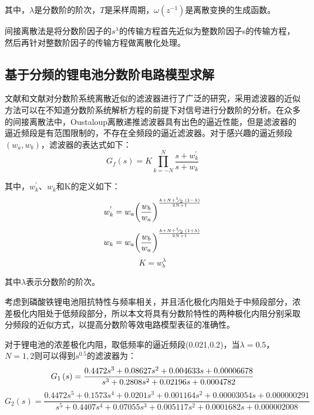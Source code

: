 其中，$\lambda $是分数阶的阶次，$T$是采样周期，$\omega \left( {{z}^{-1}} \right)$是离散变换的生成函数。

间接离散法是将分数阶因子的${{s}^{\lambda }}$的传输方程首先近似为整数阶因子s的传输方程，然后再针对整数阶因子的传输方程做离散化处理。
\subsection{基于分频的锂电池分数阶电路模型求解}
文献和文献对分数阶系统离散近似的滤波器进行了广泛的研究，采用滤波器的近似方法可以在不知道分数阶系统解析方程的前提下对信号进行分数阶的分析。在众多的间接离散法中，Oustaloup离散递推滤波器具有出色的逼近性能，但是滤波器的逼近频段是有范围限制的，不存在全频段的逼近滤波器。对于感兴趣的逼近频段$\left( {{w}_{a}},{{w}_{b}} \right)$，滤波器的表达式如下：
\begin{equation}
{{G}_{f}}\left( s \right)=K\prod\limits_{k=-N}^{N}{\frac{s+w_{k}^{'}}{s+{{w}_{k}}}}
\end{equation}

其中，$w_{k}^{'}$、${{w}_{k}}$和K的定义如下：
\begin{equation}
w_{k}^{'}={{w}_{a}}{{\left( \frac{{{w}_{b}}}{{{w}_{a}}} \right)}^{\frac{k+N+{}^{1}\!\!\diagup\!\!{}_{2}\;\left( 1-\lambda  \right)}{2N+1}}}
\end{equation}
\begin{equation}
{{w}_{k}}={{w}_{a}}{{\left( \frac{{{w}_{b}}}{{{w}_{a}}} \right)}^{\frac{k+N+{}^{1}\!\!\diagup\!\!{}_{2}\;\left( 1+\lambda  \right)}{2N+1}}}
\end{equation}
\begin{equation}
K=w_{b}^{\lambda }
\end{equation}

其中$\lambda $表示分数阶的阶次。

考虑到磷酸铁锂电池阻抗特性与频率相关，并且活化极化内阻处于中频段部分，浓差极化内阻处于低频段部分，所以本文将具有分数阶特性的两种极化内阻分别采取分频段的近似方式，以提高分数阶等效电路模型表征的准确性。

对于锂电池的浓差极化内阻，取低频率的逼近频段(0.021,0.2)，当$\lambda =0.5$，$N=1,2$则可以得到${{s}^{0.5}}$的滤波器为：
\begin{equation}
{G_1}\left( s \right) = \frac{{0.4472{s^3} + 0.08627{s^2} + 0.004633s + 0.00006678}}{{{s^3} + 0.2808{s^2} + 0.02196s + {\rm{0}}{\rm{.0004782}}}}
\end{equation}
\begin{equation}
{G_2}\left( s \right) = \frac{{0.4472{s^5} + 0.1573{s^4} + 0.0201{s^3} + 0.001164{s^2} + 0.00003054s + 0.000000291}}{{{s^5} + 0.4407{s^4} + 0.07055{s^3} + 0.005117{s^2} + 0.0001682s + 0.000002008}}
\end{equation}

